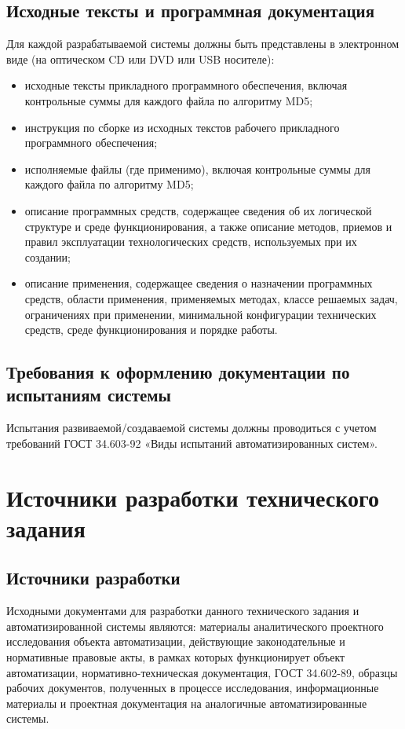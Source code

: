 \documentclass[14pt]{extreport}
\begin{document}
\subsection{Исходные тексты и программная документация}

Для каждой разрабатываемой системы должны быть представлены в
электронном виде (на оптическом CD или DVD или USB носителе):
\begin{itemize}
\item исходные тексты прикладного программного обеспечения, включая
контрольные суммы для каждого файла по алгоритму MD5;
\item инструкция по сборке из исходных текстов рабочего прикладного
программного обеспечения;
\item исполняемые файлы (где применимо), включая контрольные суммы
для каждого файла по алгоритму MD5;
\item описание программных средств, содержащее сведения об их
логической структуре и среде функционирования, а также описание методов,
приемов и правил эксплуатации технологических средств, используемых при
их создании;
\item описание применения, содержащее сведения о назначении
программных средств, области применения, применяемых методах, классе
решаемых задач, ограничениях при применении, минимальной конфигурации
технических средств, среде функционирования и порядке работы.
\end{itemize}

\subsection{Требования к оформлению документации по испытаниям системы}

Испытания развиваемой/создаваемой системы должны проводиться с
учетом требований ГОСТ 34.603-92 «Виды испытаний автоматизированных
систем».

\section{Источники разработки технического задания}

\subsection{Источники разработки}

Исходными документами для разработки данного технического задания и автоматизированной системы являются: материалы аналитического проектного исследования объекта автоматизации, действующие законодательные и нормативные правовые акты, в рамках которых функционирует объект автоматизации, нормативно-техническая документация, ГОСТ 34.602-89, образцы рабочих документов, полученных в процессе исследования, информационные материалы и проектная документация на аналогичные автоматизированные системы.
\end{document}
